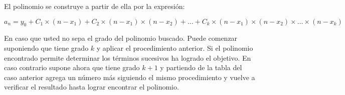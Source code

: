 El polinomio se construye a partir de ella por la expresión:

$$a_n = y_0 + C_1 \times (n-x_1) + C_2 \times (n-x_1) \times (n-x_2)+ \dots + C_k \times (n-x_1) \times (n-x_2) \times \dots \times (n-x_k) $$

En caso que usted no sepa el grado del polinomio buscado. Puede comenzar suponiendo que tiene grado $k$ y aplicar el procedimiento anterior. Si el polinomio encontrado permite determinar los términos sucesivos ha logrado el objetivo. En caso contrario supone ahora que tiene grado $k+1$ y partiendo de la tabla del caso anterior agrega un número más siguiendo el mismo procedimiento y vuelve a verificar el resultado hasta lograr encontrar el polinomio.